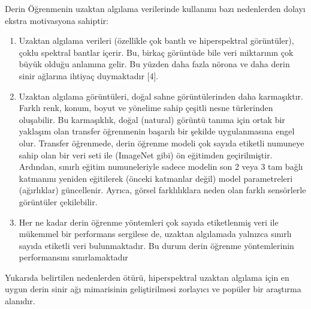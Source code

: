 Derin Öğrenmenin uzaktan algılama verilerinde kullanımı bazı nedenlerden dolayı ekstra
motivasyona sahiptir: 
\begin{enumerate}
    \item Uzaktan algılama verileri (özellikle çok bantlı ve hiperspektral
görüntüler), çoklu spektral bantlar içerir. Bu, birkaç görüntüde bile veri miktarının çok büyük
olduğu anlamına gelir. Bu yüzden daha fazla nörona ve daha derin sinir ağlarına ihtiyaç
duymaktadır [4].
    \item Uzaktan algılama görüntüleri, doğal sahne görüntülerinden daha karmaşıktır.
Farklı renk, konum, boyut ve yönelime sahip çeşitli nesne türlerinden oluşabilir. Bu karmaşıklık,
doğal (natural) görüntü tanıma için ortak bir yaklaşım olan transfer öğrenmenin başarılı bir
şekilde uygulanmasına engel olur. Transfer öğrenmede, derin öğrenme modeli çok sayıda etiketli
numuneye sahip olan bir veri seti ile (ImageNet gibi) ön eğitimden geçirilmiştir. Ardından, sınırlı
eğitim numuneleriyle sadece modelin son 2 veya 3 tam bağlı katmanını yeniden eğitilerek
(önceki katmanlar değil) model parametreleri (ağırlıklar) güncellenir. Ayrıca, görsel farklılıklara neden olan farklı sensörlerle görüntüler çekilebilir.
    \item Her ne kadar derin öğrenme yöntemleri
çok sayıda etiketlenmiş veri ile mükemmel bir performans sergilese de, uzaktan algılamada
yalnızca sınırlı sayıda etiketli veri bulunmaktadır. Bu durum derin öğrenme yöntemlerinin
performansını sınırlamaktadır
\end{enumerate}

Yukarıda belirtilen nedenlerden ötürü, hiperspektral uzaktan algılama için en uygun derin sinir
ağı mimarisinin geliştirilmesi zorlayıcı ve popüler bir araştırma alanıdır.




